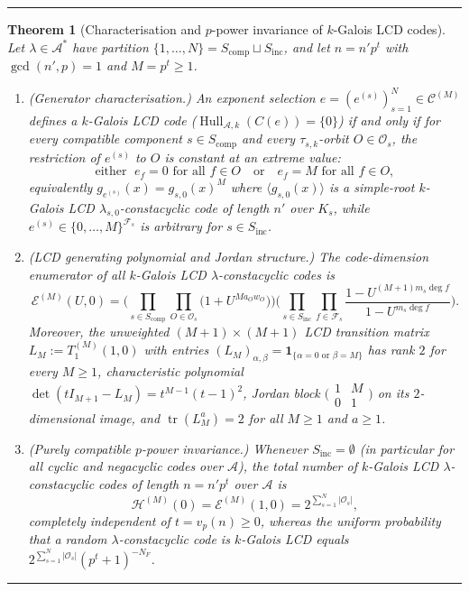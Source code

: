 \documentclass[preprint,12pt]{elsarticle}
\newcommand{\A}{\mathcal A}
\newcommand{\Fs}{\mathcal F_s}
\newcommand{\Os}{\mathcal O_s}
\newcommand{\Epoly}{\mathscr E}
\newcommand{\Hpoly}{\mathscr H}
\newcommand{\Hull}{\operatorname{Hull}}
\newcommand{\tr}{\operatorname{tr}}
\numberwithin{equation}{section}
\theoremstyle{plain}
\newtheorem{theorem}{Theorem}[section]
\theoremstyle{definition}
\theoremstyle{remark}
\newenvironment{keyresult}
  {\par\addvspace{3pt}\noindent\rule{\linewidth}{0.4pt}\par\nobreak\addvspace{3pt}}
  {\par\nobreak\addvspace{3pt}\noindent\rule{\linewidth}{0.4pt}\par\addvspace{3pt}}
\begin{document}
\begin{keyresult}
\begin{theorem}[Characterisation and $p$-power invariance of $k$-Galois LCD codes]\label{thm:lcd-invariance}
Let $\lambda\in\A^*$ have partition $\{1,\dots,N\}=S_{\mathrm{comp}}\sqcup
S_{\mathrm{inc}}$, and let $n=n'p^t$ with $\gcd(n',p)=1$ and $M=p^t\ge 1$.
\begin{enumerate}
\item[\textup{(a)}] \emph{(Generator characterisation.)} An exponent selection
$e=(e^{(s)})_{s=1}^{N}\in\mathscr C^{(M)}$ defines a $k$-Galois LCD code
($\Hull_{\A,k}(C(e))=\{0\}$) if and only if for every compatible component
$s\in S_{\mathrm{comp}}$ and every $\tau_{s,k}$-orbit $O\in\Os$, the restriction
of $e^{(s)}$ to $O$ is constant at an extreme value:
\[
\text{either }\; e_f=0\text{ for all }f\in O
\quad\text{or}\quad
e_f=M\text{ for all }f\in O,
\]
equivalently $g_{e^{(s)}}(x)=g_{s,0}(x)^M$ where $\langle g_{s,0}(x)\rangle$ is a
simple-root $k$-Galois LCD $\lambda_{s,0}$-constacyclic code of length $n'$ over
$K_s$, while $e^{(s)}\in\{0,\dots,M\}^{\Fs}$ is arbitrary for $s\in S_{\mathrm{inc}}$.
\item[\textup{(b)}] \emph{(LCD generating polynomial and Jordan structure.)} The
code-dimension enumerator of all $k$-Galois LCD $\lambda$-constacyclic codes is
\begin{equation}\label{eq:lcd-enumerator}
\Epoly^{(M)}(U,0)
 =\Biggl(\prod_{s\in S_{\mathrm{comp}}}\prod_{O\in\Os}\bigl(1+U^{Ma_Ow_O}\bigr)\Biggr)
  \Biggl(\prod_{s\in S_{\mathrm{inc}}}\prod_{f\in\Fs}
    \frac{1-U^{(M+1)m_s\deg f}}{1-U^{m_s\deg f}}\Biggr).
\end{equation}
Moreover, the unweighted $(M+1)\times(M+1)$ LCD transition matrix
$L_M:=T_1^{(M)}(1,0)$ with entries $(L_M)_{\alpha,\beta}=\mathbf 1_{\{\alpha=0
\text{ or }\beta=M\}}$ has rank $2$ for every $M\ge 1$, characteristic polynomial
$\det(tI_{M+1}-L_M)=t^{M-1}(t-1)^2$, Jordan block
$\bigl(\begin{smallmatrix}1 & M\\ 0 & 1\end{smallmatrix}\bigr)$ on its
$2$-dimensional image, and $\tr(L_M^a)=2$ for all $M\ge 1$ and $a\ge 1$.
\item[\textup{(c)}] \emph{(Purely compatible $p$-power invariance.)} Whenever
$S_{\mathrm{inc}}=\emptyset$ (in particular for all cyclic and negacyclic codes
over $\A$), the total number of $k$-Galois LCD $\lambda$-constacyclic codes of
length $n=n'p^t$ over $\A$ is
\begin{equation}\label{eq:lcd-count}
\Hpoly^{(M)}(0)=\Epoly^{(M)}(1,0)=2^{\sum_{s=1}^{N}|\Os|},
\end{equation}
completely independent of $t=v_p(n)\ge 0$, whereas the uniform probability that a
random $\lambda$-constacyclic code is $k$-Galois LCD equals
$2^{\sum_{s=1}^{N}|\Os|}(p^t+1)^{-N_F}$.
\end{enumerate}
\end{theorem}
\end{keyresult}
\end{document}
